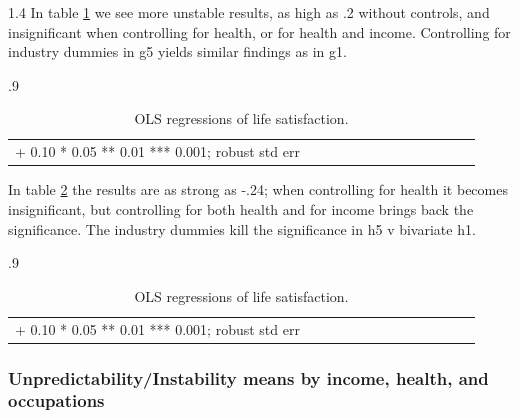 \documentclass[10pt, letterpaper]{article}
\begin{document}
\begin{spacing}{1.4}
In table \ref{regG} we see more unstable results, as high as .2 without controls, and
insignificant when controlling for health, or for health and income. Controlling for industry dummies in g5 yields similar findings as in g1.

\begin{spacing}{.9} \begin{table}[H]\centering   \begin{scriptsize} \begin{tabular}{p{1.8in}p{.5in}p{.5in}p{.5in}p{.5in}p{.5in}p{.5in}p{.5in}p{.5in}p{.5in}p{.5 in}p{.5in}p{.5 in}}\hline  \hline + 0.10 * 0.05 ** 0.01 *** 0.001; robust std err \end{tabular}\end{scriptsize}\caption{\label{regG}OLS regressions of life satisfaction.}\end{table} \end{spacing}

In table \ref{regH} the results are as strong as -.24; when controlling for health it becomes insignificant, but controlling for both 
health and for income brings back the significance. The industry dummies kill the significance in h5 v bivariate h1. 

\begin{spacing}{.9} \begin{table}[H]\centering   \begin{scriptsize} \begin{tabular}{p{1.8in}p{.5in}p{.5in}p{.5in}p{.5in}p{.5in}p{.5in}p{.5in}p{.5in}p{.5in}p{.5 in}p{.5in}p{.5 in}}\hline  \hline + 0.10 * 0.05 ** 0.01 *** 0.001; robust std err \end{tabular}\end{scriptsize}\caption{\label{regH}OLS regressions of life satisfaction.}\end{table} \end{spacing}


% 


\subsubsection{Unpredictability/Instability means by income, health, and occupations} 


\end{spacing}
\end{document}
